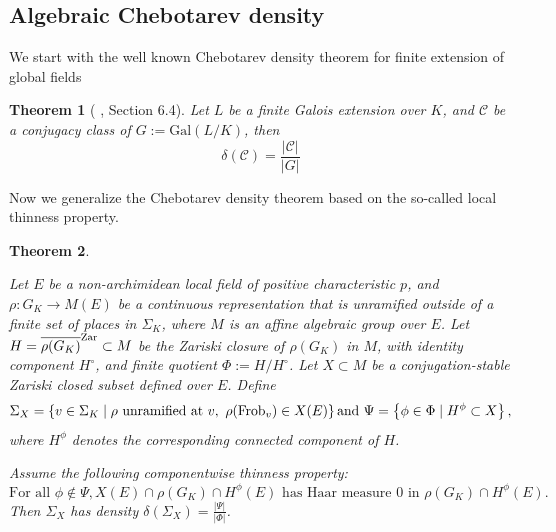 \documentclass[20pt, oneside]{article}   	%
\newtheorem{thm}{Theorem}[section]
\theoremstyle{definition}
\newcommand{\Gal}{\mathrm{Gal}}
\begin{document}
\subsection{Algebraic Chebotarev density}
We start with the well known Chebotarev density theorem for finite extension of global fields

\begin{thm}[\cite{FJ08} , Section 6.4]\label{che}
Let $L$ be a finite Galois extension over $K$, and $\mathcal{C}$ be a conjugacy class of $G:=\Gal(L/K)$, then 
$$ \delta(\mathcal{C})=\frac{|\mathcal{C}|}{|G|}$$
\end{thm}

Now we generalize the Chebotarev density theorem based on the so-called local thinness property.

\begin{thm}\label{thma}

Let $E$ be a non-archimidean local field of positive characteristic $p$, and $\rho: G_K\rightarrow M(E)$ be a continuous representation that is unramified outside of a finite set of places in $\Sigma_K$, where $M$ is an affine algebraic group over $E$.  Let $H=\overline{\rho(G_K)}^{\rm Zar}\subset M$ be the Zariski closure of $\rho(G_K)$ in $M$, with identity component $H^\circ$, and finite quotient $\Phi:=H/H^\circ$.  Let $X\subset M$ be a conjugation-stable Zariski closed subset defined over $E$. Define
$$\Sigma_X=\left\{v\in\Sigma_K\mid \rho \textrm{ unramified at } v,\ \rho({\rm Frob}_v)\in X(E) \right\} {\rm and }\ \Psi=\left\{\phi\in\Phi\mid H^{\phi}\subset X \right\},$$ where $H^\phi$ denotes the corresponding connected component of $H$.

Assume the following componentwise thinness property:
\begin{equation}\tag{CT}
\textrm{For all $\phi\not\in\Psi$}, X(E)\cap\rho(G_K)\cap H^\phi(E) \textrm{ has Haar measure $0$ in }\rho(G_K)\cap H^\phi(E).
\end{equation}
Then $\Sigma_X$ has density $\delta(\Sigma_X)=\frac{|\Psi|}{|\Phi|}$.

\end{thm}
\end{document}
